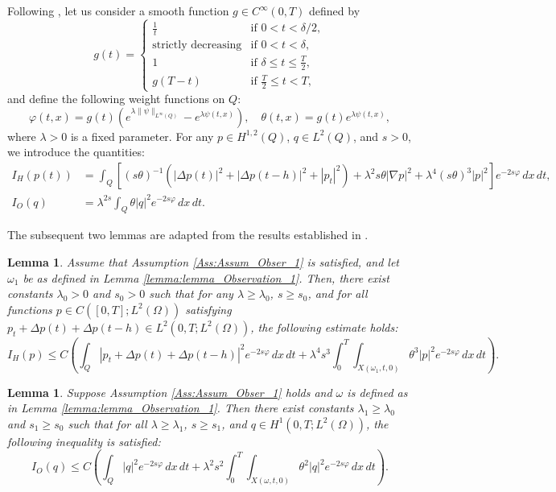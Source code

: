 \documentclass[12pt]{article}
\theoremstyle{plain}
\newtheorem{lemma}[theorem]{Lemma}
\theoremstyle{definition}
\begin{document}
Following \cite{chaves2014null}, let us consider a smooth function $g \in C^\infty(0,T)$ defined by
\[
g(t) = 
\begin{cases}
\frac{1}{t} & \text{if } 0 < t < \delta/2, \\
\text{strictly decreasing} & \text{if } 0 < t < \delta, \\
1 & \text{if } \delta \leq t \leq \frac{T}{2}, \\
g(T - t) & \text{if } \frac{T}{2} \leq t < T,
\end{cases}
\]
and define the following weight functions on $Q$:
\[
\varphi(t,x) = g(t) \left( e^{\lambda \|\psi\|_{L^\infty(Q)}} - e^{\lambda \psi(t,x)} \right), \quad
\theta(t,x) = g(t) e^{\lambda \psi(t,x)},
\]
where $\lambda > 0$ is a fixed parameter. For any $p \in H^{1,2}(Q)$, $q \in L^2(Q)$, and $s > 0$, we introduce the quantities:
\begin{align}
I_H(p(t)) &= \int_Q \left[ (s\theta)^{-1}(|\Delta p(t)|^2+|\Delta p(t-h)|^2 + |p_t|^2) + \lambda^2 s \theta |\nabla p|^2 + \lambda^4 (s \theta)^3 |p|^2 \right] e^{-2s\varphi} \, dx \, dt,  \\
I_O(q) &= \lambda^{2s} \int_Q \theta |q|^2 e^{-2s\varphi} \, dx \, dt. 
\end{align}

The subsequent two lemmas are adapted from the results established in \cite{chaves2014null}.
\begin{lemma}\cite{chaves2014null}
\label{lemma:lemma_Observation_2}
Assume that Assumption \ref{Ass:Assum_Obser_1} is satisfied, and let $\omega_1$ be as defined in Lemma \ref{lemma:lemma_Observation_1}. Then, there exist constants $\lambda_0 > 0$ and $s_0 > 0$ such that for any $\lambda \geq \lambda_0$, $s \geq s_0$, and for all functions $p \in C([0,T];L^2(\Omega))$ satisfying $p_t + \Delta p(t) + \Delta p(t-h) \in L^2(0,T;L^2(\Omega))$, the following estimate holds:
\begin{equation}
I_H(p) \leq C \left( \int_Q |p_t + \Delta p(t)+ \Delta p(t-h)|^2 e^{-2s\varphi} \, dx \, dt + \lambda^4 s^3 \int_0^T \int_{X(\omega_1,t,0)} \theta^3 |p|^2 e^{-2s\varphi} \, dx \, dt \right).
\end{equation}
\end{lemma}

\begin{lemma}\cite{chaves2014null}
\label{lemma:lemma_Observation_3}
Suppose Assumption \ref{Ass:Assum_Obser_1} holds and $\omega$ is defined as in Lemma \ref{lemma:lemma_Observation_1}. Then there exist constants $\lambda_1 \geq \lambda_0$ and $s_1 \geq s_0$ such that for all $\lambda \geq \lambda_1$, $s \geq s_1$, and $q \in H^1(0,T;L^2(\Omega))$, the following inequality is satisfied:
\begin{equation}
I_O(q) \leq C \left( \int_Q |q|^2 e^{-2s\varphi} \, dx \, dt + \lambda^2 s^2 \int_0^T \int_{X(\omega,t,0)} \theta^2 |q|^2 e^{-2s\varphi} \, dx \, dt \right).
\end{equation}
\end{lemma}
\end{document}
